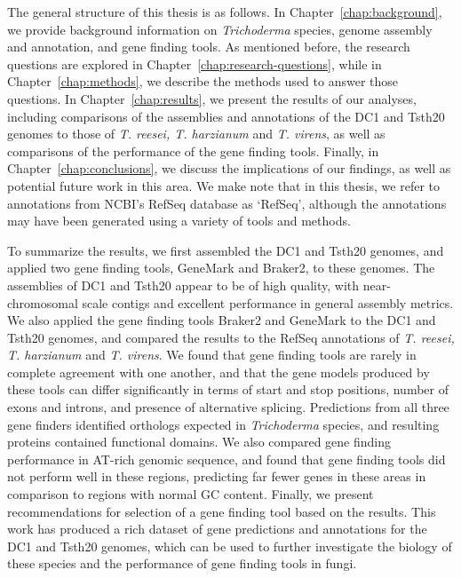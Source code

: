 The general structure of this thesis is as follows. In Chapter~\ref{chap:background}, we provide background information on \textit{Trichoderma} species, genome assembly and annotation, and gene finding tools. As mentioned before, the research questions are explored in Chapter~\ref{chap:research-questions}, while in Chapter~\ref{chap:methods}, we describe the methods used to answer those questions. In Chapter~\ref{chap:results}, we present the results of our analyses, including comparisons of the assemblies and annotations of the DC1 and Tsth20 genomes to those of \textit{T. reesei, T. harzianum} and \textit{T. virens}, as well as comparisons of the performance of the gene finding tools. Finally, in Chapter~\ref{chap:conclusions}, we discuss the implications of our findings, as well as potential future work in this area. We make note that in this thesis, we refer to annotations from NCBI's RefSeq database as `RefSeq', although the annotations may have been generated using a variety of tools and methods. 

  To summarize the results, we first assembled the DC1 and Tsth20 genomes, and applied two gene finding tools, GeneMark and Braker2, to these genomes. The assemblies of DC1 and Tsth20 appear to be of high quality, with near-chromosomal scale contigs and excellent performance in general assembly metrics. We also applied the gene finding tools Braker2 and GeneMark to the DC1 and Tsth20 genomes, and compared the results to the RefSeq annotations of \textit{T. reesei, T. harzianum} and \textit{T. virens}. We found that gene finding tools are rarely in complete agreement with one another, and that the gene models produced by these tools can differ significantly in terms of start and stop positions, number of exons and introns, and presence of alternative splicing. Predictions from all three gene finders identified orthologs expected in \textit{Trichoderma} species, and resulting proteins contained functional domains. We also compared gene finding performance in AT-rich genomic sequence, and found that gene finding tools did not perform well in these regions, predicting far fewer genes in these areas in comparison to regions with normal GC content. Finally, we present recommendations for selection of a gene finding tool based on the results. This work has produced a rich dataset of gene predictions and annotations for the DC1 and Tsth20 genomes, which can be used to further investigate the biology of these species and the performance of gene finding tools in fungi.